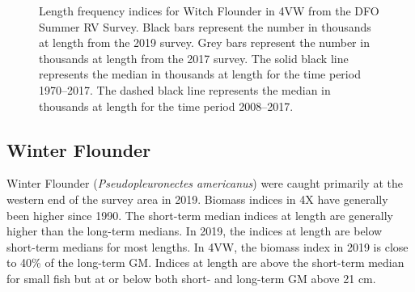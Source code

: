 \documentclass[11pt]{book}
\begin{document}
\begin{figure}[htb]

{\centering {} 

}

\caption{Length frequency indices for Witch Flounder in 4VW from the DFO Summer RV Survey. Black bars represent the number in thousands at length from the 2019 survey. Grey bars represent the number in thousands at length from the 2017 survey. The solid black line represents the median in thousands at length for the time period 1970--2017. The dashed black line represents the median in thousands at length for the time period 2008--2017.}\label{fig:59-fig-witchflounder-lengthfreq4VW}
\end{figure}
\clearpage

\hypertarget{winter-flounder}{%
\subsection{Winter Flounder}\label{winter-flounder}}

Winter Flounder (\emph{Pseudopleuronectes americanus}) were caught primarily at the western end of the survey area in 2019. Biomass indices in 4X have generally been higher since 1990. The short-term median indices at length are generally higher than the long-term medians. In 2019, the indices at length are below short-term medians for most lengths. In 4VW, the biomass index in 2019 is close to 40\% of the long-term GM. Indices at length are above the short-term median for small fish but at or below both short- and long-term GM above 21 cm.
\end{document}
